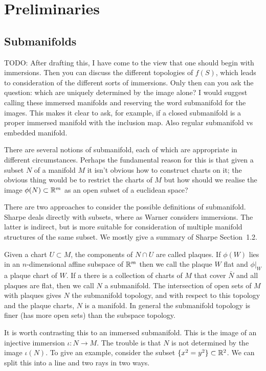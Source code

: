 
\section{Preliminaries}

\subsection{Submanifolds}

TODO: After drafting this, I have come to the view that one should begin with immersions.
Then you can discuss the different topologies of $f(S)$, which leads to consideration of the different sorts of immersions.
Only then can you ask the question: which are uniquely determined by the image alone?
I would suggest calling these immersed manifolds and reserving the word submanifold for the images.
This makes it clear to ask, for example, if a closed submanifold is a proper immersed manifold with the inclusion map.
Also regular submanifold vs embedded manifold.

There are several notions of submanifold, each of which are appropriate in different circumstances.
Perhaps the fundamental reason for this is that given a subset $N$ of a manifold $M$ it isn't obvious how to construct charts on it; the obvious thing would be to restrict the charts of $M$ but how should we realise the image $\phi(N) \subset \mathbb{R}^m$ as an open subset of a euclidean space?

There are two approaches to consider the possible definitions of submanifold. Sharpe deals directly with subsets, where as Warner considers immersions.
The latter is indirect, but is more suitable for consideration of multiple manifold structures of the same subset.
We mostly give a summary of Sharpe Section~1.2.

Given a chart $U \subset M$, the components of $N\cap U$ are called plaques.
If $\phi(W)$ lies in an $n$-dimensional affine subspace of $\mathbb{R}^m$ then we call the plaque $W$ flat and $\phi|_W$ a plaque chart of $W$.
If a there is a collection of charts of $M$ that cover $\bar{N}$ and all plaques are flat, then we call $N$ a submanifold.
The intersection of open sets of $M$ with plaques gives $N$ the submanifold topology, and with respect to this topology and the plaque charts, $N$ is a manifold.
In general the submanifold topology is finer (has more open sets) than the subspace topology.

It is worth contrasting this to an immersed submanifold. This is the image of an injective immersion $\iota : N \to M$.
The trouble is that $N$ is not determined by the image $\iota(N)$.
To give an example, consider the subset $\{x^2 = y^2\} \subset \mathbb{R}^2$.
We can split this into a line and two rays in two ways.

